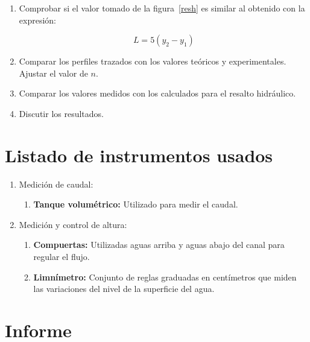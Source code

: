\documentclass[10pt, a4paper]{exam}
\begin{document}
\begin{enumerate}
\item Comprobar si el valor tomado de la figura~\ref{resh} es similar al obtenido con la expresión:

    $$L=5(y_2-y_1)$$

    \item Comparar los perfiles trazados con los valores teóricos y experimentales. Ajustar el valor de $n$.

    \item Comparar los valores medidos con los calculados para el resalto hidr\'aulico.

    \item Discutir los resultados.
\end{enumerate}


\section{Listado de instrumentos usados}

\begin{enumerate}

    \item Medición de caudal:
    
        \begin{enumerate}
        
            \item \textbf{Tanque volumétrico:} Utilizado para medir el caudal.
            
        \end{enumerate}
        
    \item Medición y control de altura:
    
        \begin{enumerate}
        
            \item \textbf{Compuertas:} Utilizadas aguas arriba y aguas abajo del canal para regular el flujo.
            \item \textbf{Limnímetro:} Conjunto de reglas graduadas en centímetros que miden las variaciones del nivel de la superficie del agua.
            
        \end{enumerate}
        
\end{enumerate}

\section{Informe}
\end{document}

